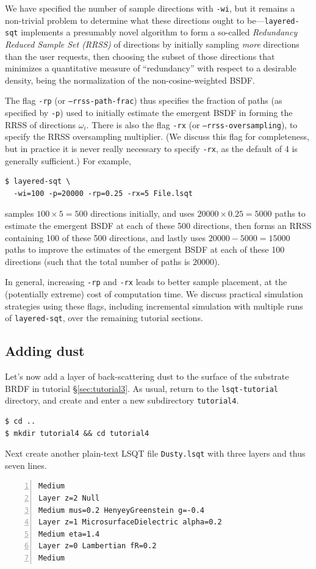 \documentclass[
    twoside,
    twocolumn,
    letterpaper,
    10pt]{article}
\begin{document}
We have specified the number of sample directions with \texttt{-wi}, but 
it remains a non-trivial problem to determine what these directions ought to 
be---\texttt{layered-sqt} implements 
a presumably novel algorithm to form a so-called \emph{Redundancy Reduced
Sample Set (RRSS)} of directions by initially sampling \emph{more} directions 
than the user requests, then choosing the subset of those directions that 
minimizes a quantitative measure of ``redundancy'' with respect to a desirable 
density, being the normalization of the non-cosine-weighted BSDF. 

The flag \texttt{-rp} (or \texttt{--rrss-path-frac}) thus specifies
the fraction of paths (as specified by \texttt{-p}) used to initially
estimate the emergent BSDF in forming the RRSS of directions $\omega_i$. 
There is also the flag \texttt{-rx} (or \texttt{--rrss-oversampling}), 
to specify the RRSS oversampling multiplier. (We discuss this flag for 
completeness, but in practice it is never really necessary to specify 
\texttt{-rx}, as the default of 4 is generally sufficient.)
For example, 
\begin{verbatim}
$ layered-sqt \
  -wi=100 -p=20000 -rp=0.25 -rx=5 File.lsqt
\end{verbatim}
samples $100\times5=500$ directions initially, and uses
$20000\times0.25=5000$ paths to estimate the emergent BSDF at each of 
these 500 directions, then forms an RRSS containing 100 of these 500 
directions, and lastly uses $20000-5000=15000$ paths to improve the 
estimates of the emergent BSDF at each of these 100 directions (such that
the total number of paths is $20000$).

In general, increasing \texttt{-rp} and \texttt{-rx} leads to better
sample placement, at the (potentially extreme) cost of computation time.
We discuss practical simulation strategies using these flags, including 
incremental simulation with multiple runs of \texttt{layered-sqt}, over
the remaining tutorial sections. 

\subsection{Adding dust}
\label{sec:tutorial4}

Let's now add a layer of back-scattering dust to the surface
of the substrate BRDF in tutorial \S\ref{sec:tutorial3}. As usual, return
to the \texttt{lsqt-tutorial} directory, and create and enter a new 
subdirectory \texttt{tutorial4}.
\begin{verbatim}
$ cd ..
$ mkdir tutorial4 && cd tutorial4
\end{verbatim}
Next create another plain-text LSQT file \texttt{Dusty.lsqt} with three 
layers and thus seven lines.
\begin{lstlisting}[numbers=left]
Medium
Layer z=2 Null
Medium mus=0.2 HenyeyGreenstein g=-0.4
Layer z=1 MicrosurfaceDielectric alpha=0.2
Medium eta=1.4
Layer z=0 Lambertian fR=0.2
Medium
\end{lstlisting}
\end{document}
